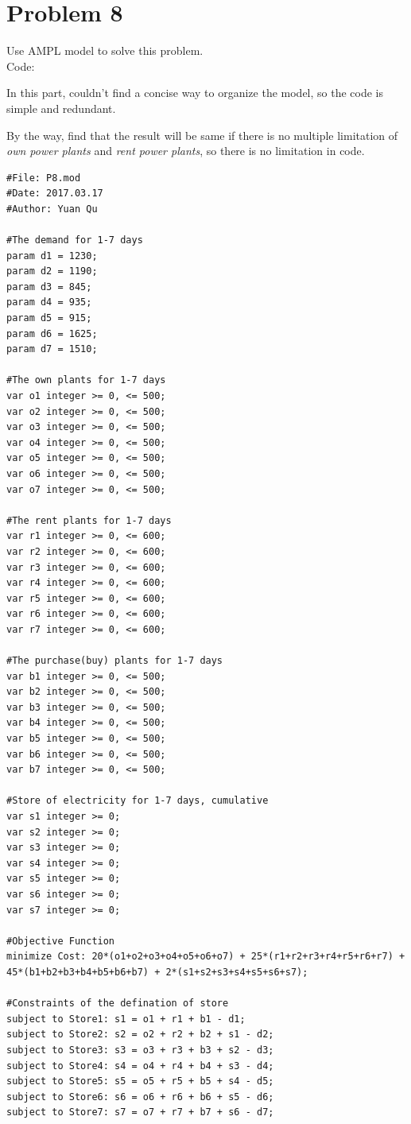 \documentclass{article}
\begin{document}
\section*{Problem 8}{
    Use AMPL model to solve this problem. \\

    Code:

    In this part, couldn't find a concise way to organize the model, so the code is simple and redundant.

    By the way, find that the result will be same if there is no multiple limitation of \textit{own power plants} and \textit{rent power plants}, so there is no limitation in code.
    \begin{lstlisting}[language=AMPL]
#File: P8.mod
#Date: 2017.03.17
#Author: Yuan Qu

#The demand for 1-7 days
param d1 = 1230; 
param d2 = 1190;
param d3 = 845;
param d4 = 935;
param d5 = 915;
param d6 = 1625;
param d7 = 1510;

#The own plants for 1-7 days
var o1 integer >= 0, <= 500;
var o2 integer >= 0, <= 500;
var o3 integer >= 0, <= 500;
var o4 integer >= 0, <= 500;
var o5 integer >= 0, <= 500;
var o6 integer >= 0, <= 500;
var o7 integer >= 0, <= 500;

#The rent plants for 1-7 days
var r1 integer >= 0, <= 600;
var r2 integer >= 0, <= 600;
var r3 integer >= 0, <= 600;
var r4 integer >= 0, <= 600;
var r5 integer >= 0, <= 600;
var r6 integer >= 0, <= 600;
var r7 integer >= 0, <= 600;

#The purchase(buy) plants for 1-7 days
var b1 integer >= 0, <= 500;
var b2 integer >= 0, <= 500;
var b3 integer >= 0, <= 500;
var b4 integer >= 0, <= 500;
var b5 integer >= 0, <= 500;
var b6 integer >= 0, <= 500;
var b7 integer >= 0, <= 500;

#Store of electricity for 1-7 days, cumulative
var s1 integer >= 0;
var s2 integer >= 0;
var s3 integer >= 0;
var s4 integer >= 0;
var s5 integer >= 0;
var s6 integer >= 0;
var s7 integer >= 0;

#Objective Function
minimize Cost: 20*(o1+o2+o3+o4+o5+o6+o7) + 25*(r1+r2+r3+r4+r5+r6+r7) + 45*(b1+b2+b3+b4+b5+b6+b7) + 2*(s1+s2+s3+s4+s5+s6+s7);

#Constraints of the defination of store
subject to Store1: s1 = o1 + r1 + b1 - d1;
subject to Store2: s2 = o2 + r2 + b2 + s1 - d2;
subject to Store3: s3 = o3 + r3 + b3 + s2 - d3;
subject to Store4: s4 = o4 + r4 + b4 + s3 - d4;
subject to Store5: s5 = o5 + r5 + b5 + s4 - d5;
subject to Store6: s6 = o6 + r6 + b6 + s5 - d6;
subject to Store7: s7 = o7 + r7 + b7 + s6 - d7;


\end{lstlisting}}
\end{document}
